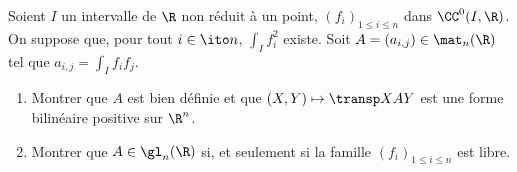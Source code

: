 \begin{enonce}
\begin{exercise}[ID={RMS124 E655 Mines-Ponts PSI},subtitle={},tags={}]
Soient $I$ un intervalle de $\R$ non réduit à un point, $(f_i)_{1\leq i\leq n}$ dans $\CC^0(I,\R)$.
On suppose que, pour tout $i\in\ito n$, $\int_I f_i^2$ existe.
Soit $A=(a_{i,j})\in\mat_n(\R)$ tel que $a_{i,j}=\int_I f_if_j$.
\begin{enumerate}
  \item Montrer que $A$ est bien définie et que $(X,Y)\mapsto \transp X A Y$ est une forme bilinéaire positive sur $\R^n$.
  \item Montrer que $A\in\gl_n(\R)$ si, et seulement si la famille $(f_i)_{1\leq i\leq n}$ est libre.
\end{enumerate}
\end{exercise}
\begin{solution}
\end{solution}
\end{enonce}
